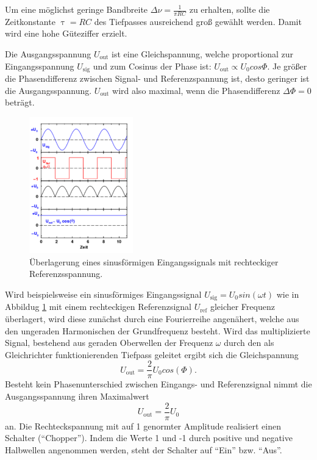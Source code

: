 Um eine möglichst geringe Bandbreite $\Delta{\nu}=\frac{1}{\pi RC}$ zu erhalten, sollte die Zeitkonstante $\uptau=RC$ des Tiefpasses ausreichend groß gewählt werden. Damit wird eine hohe Güteziffer erzielt.

Die Ausgangsspannung $U_\mathup{out}$ ist eine Gleichspannung, welche proportional zur Eingangsspannung $U_\mathup{sig}$ und zum Cosinus der Phase ist: $U_\mathup{out}\propto{U_0}cos\Phi$. Je größer die Phasendifferenz zwischen Signal- und Referenzspannung ist, desto geringer ist die Ausgangsspannung. $U_\mathup{out}$ wird also maximal, wenn die Phasendifferenz $\Delta\Phi=0$ beträgt.

\begin{figure}
	\centering
		\includegraphics[width=0.4\textwidth]{Bilder/Beispiel.pdf}
		\caption{Überlagerung eines sinusförmigen Eingangssignals mit rechteckiger Referenzsspannung.}
		\label{fig:bsp}
	\end{figure}
Wird beispielsweise ein sinusförmiges Eingangssignal $U_\mathup{sig}=U_0sin(\omega t)$ wie in Abbildug \ref{fig:bsp} mit einem rechteckigen Referenzsignal $U_\mathup{ref}$ gleicher Frequenz überlagert, wird diese zunächst durch eine Fourierreihe angenähert, welche aus den ungeraden Harmonischen der Grundfrequenz besteht. Wird das multiplizierte Signal,  bestehend aus geraden Oberwellen der Frequenz $\omega$ durch den als Gleichrichter funktionierenden Tiefpass geleitet ergibt sich die Gleichspannung
\begin{equation}
U_\mathup{out}=\frac{2}{\pi}U_0cos(\Phi).
\end{equation}
Besteht kein Phasenunterschied zwischen Eingangs- und Referenzsignal nimmt die Ausgangsspannung ihren Maximalwert 
\begin{equation}
U_\mathup{out}=\frac{2}{\pi}U_0
\end{equation}
an.
Die Rechteckspannung mit auf 1 genormter Amplitude realisiert einen Schalter (\enquote{Chopper}). Indem die Werte 1 und -1 durch positive und negative Halbwellen angenommen werden, steht der Schalter auf \enquote{Ein} bzw. \enquote{Aus}.




